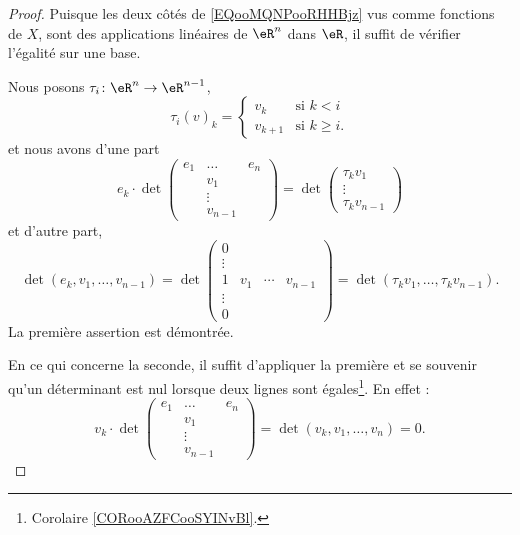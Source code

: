 \begin{proof}
	Puisque les deux côtés de \eqref{EQooMQNPooRHHBjz} vus comme fonctions de \( X\), sont des applications linéaires de \( \eR^n\) dans \( \eR\), il suffit de vérifier l'égalité sur une base.

	Nous posons \( \tau_i\colon \eR^n\to \eR^{n-1}\),
	\begin{equation}
		\tau_i(v)_k=\begin{cases}
			v_k     & \text{si } k<i             \\
			v_{k+1} & \text{si } k\geq i\text{.}
		\end{cases}
	\end{equation}
	et nous avons d'une part
	\begin{equation}
		e_k\cdot
		\det
		\begin{pmatrix}
			e_1 & \ldots  & e_n \\
			    & v_1     &     \\
			    & \vdots  &     \\
			    & v_{n-1} &
		\end{pmatrix}
		=\det\begin{pmatrix}
			\tau_kv_1 \\
			\vdots    \\
			\tau_kv_{n-1}
		\end{pmatrix}
	\end{equation}
	et d'autre part,
	\begin{equation}
		\det(e_k,v_1,\ldots, v_{n-1})=\det
		\begin{pmatrix}
			0      &     &        &         \\
			\vdots &     &        &         \\
			1      & v_1 & \cdots & v_{n-1} \\
			\vdots &     &        &         \\
			0      &     &        &
		\end{pmatrix}=\det(\tau_k v_1,\ldots, \tau_k v_{n-1}).
	\end{equation}
	La première assertion est démontrée.

	En ce qui concerne la seconde, il suffit d'appliquer la première et se souvenir qu'un déterminant est nul lorsque deux lignes sont égales\footnote{Corolaire \ref{CORooAZFCooSYINvBl}.}. En effet :
	\begin{equation}
		v_k\cdot \det
		\begin{pmatrix}
			e_1 & \ldots  & e_n \\
			    & v_1     &     \\
			    & \vdots  &     \\
			    & v_{n-1} &
		\end{pmatrix}
		= \det(v_k,v_1,\ldots, v_n)=0.
	\end{equation}
\end{proof}


